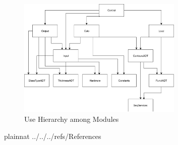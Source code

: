 \documentclass[12pt]{article}
\begin{document}
\begin{figure}[H]
	\centering
	\includegraphics[width=0.7\textwidth]{GlassBR-UsesHierarchy-FunctADT.pdf}
	\caption{Use Hierarchy among Modules}
	\label{FigUH}
\end{figure}


 {plainnat}
 {../../../refs/References}
\end{document}
